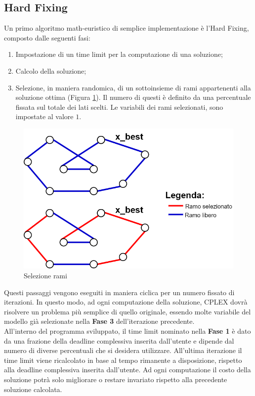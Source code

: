 \subsection{Hard Fixing}\label{hard fixing}
Un primo algoritmo math-euristico di semplice implementazione è l'Hard Fixing, composto dalle seguenti fasi:
\begin{enumerate}
\item{Impostazione di un time limit per la computazione di una soluzione;}
\item{Calcolo della soluzione;}
\item{Selezione, in maniera randomica, di un sottoinsieme di rami appartenenti alla soluzione ottima (Figura \ref{selezione_rami}). 
Il numero di questi è definito da una percentuale fissata sul totale dei lati scelti. Le variabili dei rami selezionati, sono impostate al valore $1$.}
\end{enumerate}
\begin{figure}[h] 
\begin{center} 
  \includegraphics[scale=0.38]{Images/x_best} 
  \caption{\footnotesize{Selezione rami}}
  \label{selezione_rami} 
\end{center} 
\end{figure}
Questi passaggi vengono eseguiti in maniera ciclica per un numero fissato di iterazioni. In questo modo, ad ogni computazione della soluzione, CPLEX dovrà risolvere un problema più semplice di quello originale, essendo molte variabile del modello già selezionate nella \textbf{Fase 3} dell'iterazione precedente.\\
All'interno del programma sviluppato, il time limit nominato nella \textbf{Fase 1} è dato da una frazione della deadline complessiva inserita dall'utente e dipende dal numero di diverse percentuali che si desidera utilizzare. All'ultima iterazione il time limit viene ricalcolato in base al tempo rimanente a disposizione, rispetto alla deadline complessiva inserita dall'utente. Ad ogni computazione il costo della soluzione potrà solo migliorare o restare invariato rispetto alla precedente soluzione calcolata.\\
